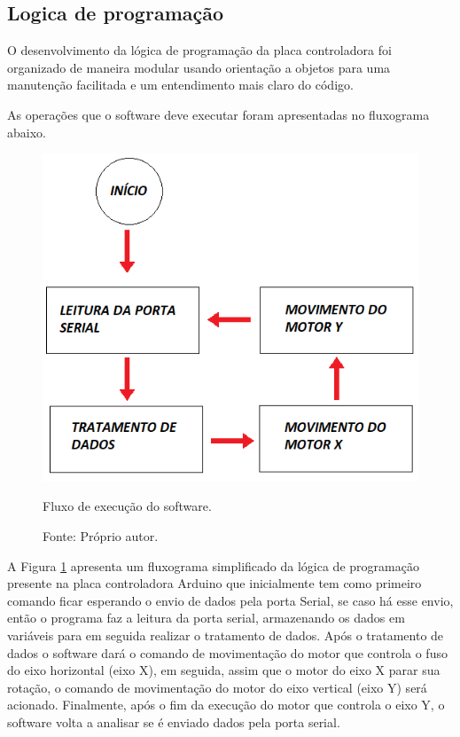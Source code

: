 \subsection{Logica de programação}\label{subsec:metlogica}

O desenvolvimento da lógica de programação da placa controladora foi organizado de maneira modular 
usando orientação a objetos para uma manutenção facilitada e um entendimento mais claro do código.

As operações que o software deve executar foram apresentadas no fluxograma abaixo.

\begin{figure}[!htb]
\centering
\includegraphics[scale = 0.7]{figuras/3-20}
\caption{Fluxo de execução do software.}
\caption*{Fonte: Próprio autor.}
\label{fig:fluxoexecucao}
\end{figure}
    
A Figura \ref{fig:fluxoexecucao} apresenta um fluxograma simplificado da lógica de programação presente na placa controladora 
Arduino que inicialmente tem como primeiro comando ficar esperando o envio de dados pela porta Serial, 
se caso há esse envio, então o programa faz a leitura da porta serial, armazenando os dados em variáveis 
para em seguida realizar o tratamento de dados. Após o tratamento de dados o software dará o comando de 
movimentação do motor que controla o fuso do eixo horizontal (eixo X), em seguida, assim que o motor do 
eixo X parar sua rotação, o comando de movimentação do motor do eixo vertical (eixo Y) será acionado. 
Finalmente, após o fim da execução do motor que controla o eixo Y, o software volta a analisar se é enviado 
dados pela porta serial.

